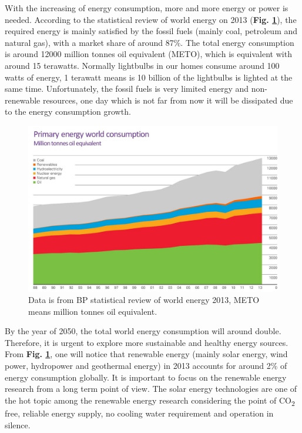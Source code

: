 \documentclass[a4paper, 12pt, titlepage,oneside,drop]{kthesis}
\begin{document}
With the increasing of energy consumption, more and more energy or power is needed. According to the statistical review of world energy on 2013 (\textbf{Fig. \ref{wpec}}),
the required energy is mainly satisfied by the fossil fuels (mainly coal, petroleum and 
natural gas), with a market share of around 87\%. The total energy consumption is around 12000 million tonnes oil equivalent (METO), which is equivalent with around 15 terawatts. 
Normally lightbulbs in our homes consume around 100 watts of energy, 1 terawatt means is 10 billion of the lightbulbs is lighted at the same time. 
Unfortunately, the fossil fuels is very limited energy and non-renewable resources, one day which is not far from  now it will be dissipated due to the energy consumption growth.

\begin{figure}[H]
\centering
\includegraphics[scale=0.4]{energy.jpg}
\caption{Data is from BP statistical review of world energy 2013, METO means million tonnes oil equivalent.}
\label{wpec}
\end{figure}

By the year of 2050, the total world energy consumption will around double. Therefore, it is urgent to explore more sustainable and healthy energy sources. From \textbf{Fig. \ref{wpec}}, one will notice that renewable energy (mainly solar energy, wind power, hydropower and 
geothermal energy) in 2013 accounts for around 2\% of energy consumption globally. It is important to focus on the renewable energy research from a long term point of view.
The solar energy technologies are one of the hot topic among the renewable energy research considering the point of CO\textsubscript{2} free, reliable energy supply, no cooling water requirement and operation in silence.
\end{document}
